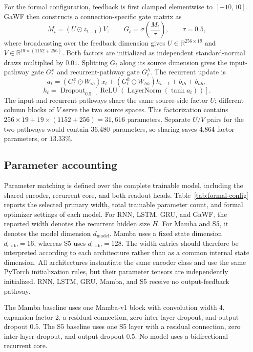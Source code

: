 For the formal configuration, feedback is first clamped elementwise to \([-10,10]\). GaWF then constructs a connection-specific gate matrix as
\[
M_t=(U\odot z_{t-1})V,
\qquad
G_t=\sigma\!\left(\frac{M_t}{\tau}\right),
\qquad \tau=0.5,
\]
where broadcasting over the feedback dimension gives \(U\in\mathbb{R}^{256\times19}\) and \(V\in\mathbb{R}^{19\times(1152+256)}\). Both factors are initialized as independent standard-normal draws multiplied by \(0.01\). Splitting \(G_t\) along its source dimension gives the input-pathway gate \(G_t^x\) and recurrent-pathway gate \(G_t^h\). The recurrent update is
\[
a_t=(G_t^x\odot W_{ih})x_t+(G_t^h\odot W_{hh})h_{t-1}+b_{ih}+b_{hh},
\]
\[
h_t=\operatorname{Dropout}_{0.5}\!\left[\operatorname{ReLU}\!\left(\operatorname{LayerNorm}\!\left(\tanh a_t\right)\right)\right].
\]
The input and recurrent pathways share the same source-side factor \(U\); different column blocks of \(V\) serve the two source spaces. This factorization contains \(256\times19+19\times(1152+256)=31{,}616\) parameters. Separate \(U/V\) pairs for the two pathways would contain 36,480 parameters, so sharing saves 4,864 factor parameters, or \(13.33\%\).

\subsection{Parameter accounting}

Parameter matching is defined over the complete trainable model, including the shared encoder, recurrent core, and both readout heads. Table~\ref{tab:formal-config} reports the selected primary width, total trainable parameter count, and formal optimizer settings of each model. For RNN, LSTM, GRU, and GaWF, the reported width denotes the recurrent hidden size \(H\). For Mamba and S5, it denotes the model dimension \(d_{\mathrm{model}}\). Mamba uses a fixed state dimension \(d_{\mathrm{state}}=16\), whereas S5 uses \(d_{\mathrm{state}}=128\). The width entries should therefore be interpreted according to each architecture rather than as a common internal state dimension. All architectures instantiate the same encoder class and use the same PyTorch initialization rules, but their parameter tensors are independently initialized. RNN, LSTM, GRU, Mamba, and S5 receive no output-feedback pathway.

The Mamba baseline uses one Mamba-v1 block with convolution width 4, expansion factor 2, a residual connection, zero inter-layer dropout, and output dropout \(0.5\). The S5 baseline uses one S5 layer with a residual connection, zero inter-layer dropout, and output dropout \(0.5\). No model uses a bidirectional recurrent core.

